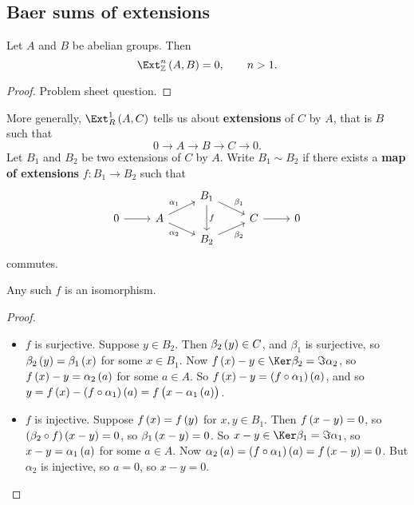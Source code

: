 \subsection{Baer sums of extensions}

\begin{proposition}
Let $ A $ and $ B $ be abelian groups. Then
$$ \Ext_\ZZ^n\br{A, B} = 0, \qquad n > 1. $$
\end{proposition}

\begin{proof}
Problem sheet question.
\end{proof}

More generally, $ \Ext_R^1\br{A, C} $ tells us about \textbf{extensions} of $ C $ by $ A $, that is $ B $ such that
$$ 0 \to A \to B \to C \to 0. $$
Let $ B_1 $ and $ B_2 $ be two extensions of $ C $ by $ A $. Write $ B_1 \sim B_2 $ if there exists a \textbf{map of extensions} $ f : B_1 \to B_2 $ such that
$$
\begin{tikzcd}[row sep=tiny]
& & B_1 \arrow{dr}{\beta_1} \arrow{dd}{f} & & \\
0 \arrow{r} & A \arrow{ur}{\alpha_1} \arrow[swap]{dr}{\alpha_2} & & C \arrow{r} & 0 \\
& & B_2 \arrow[swap]{ur}{\beta_2} & &
\end{tikzcd}
$$
commutes.

\pagebreak

\begin{proposition}
Any such $ f $ is an isomorphism.
\end{proposition}

\begin{proof}
\hfill
\begin{itemize}
\item $ f $ is surjective. Suppose $ y \in B_2 $. Then $ \beta_2\br{y} \in C $, and $ \beta_1 $ is surjective, so $ \beta_2\br{y} = \beta_1\br{x} $ for some $ x \in B_1 $. Now $ f\br{x} - y \in \Ker \beta_2 = \Im \alpha_2 $, so $ f\br{x} - y = \alpha_2\br{a} $ for some $ a \in A $. So $ f\br{x} - y = \br{f \circ \alpha_1}\br{a} $, and so $ y = f\br{x} - \br{f \circ \alpha_1}\br{a} = f\br{x - \alpha_1\br{a}} $.
\item $ f $ is injective. Suppose $ f\br{x} = f\br{y} $ for $ x, y \in B_1 $. Then $ f\br{x - y} = 0 $, so $ \br{\beta_2 \circ f}\br{x - y} = 0 $, so $ \beta_1\br{x - y} = 0 $. So $ x - y \in \Ker \beta_1 = \Im \alpha_1 $, so $ x - y = \alpha_1\br{a} $ for some $ a \in A $. Now $ \alpha_2\br{a} = \br{f \circ \alpha_1}\br{a} = f\br{x - y} = 0 $. But $ \alpha_2 $ is injective, so $ a = 0 $, so $ x - y = 0 $.
\end{itemize}
\end{proof}

